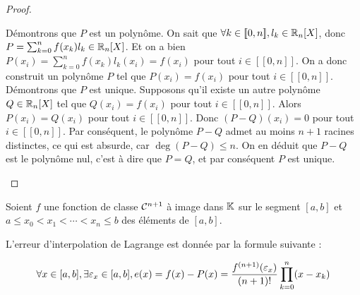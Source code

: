 \documentclass[12pt,a4paper]{report}
\begin{document}
\begin{proof}
    \begin{outline}
        \1 Démontrons que $P$ est un polynôme.
            \2 On sait que $\forall k \in [\![0,n]\!], l_k \in \mathbb{R}_n[X]$, donc $P = \sum_{k=0}^{n}f(x_k) l_k \in \mathbb{R}_n[X]$.
            \2 Et on a bien $P(x_i) = \sum_{k=0}^{n} f(x_k) l_k(x_i) = f(x_i)$ pour tout $i \in [\![0,n]\!]$.
            \2 On a donc construit un polynôme $P$ tel que $P(x_i) = f(x_i)$ pour tout $i \in [\![0,n]\!]$.
        \1 Démontrons que $P$ est unique.
            \2 Supposons qu'il existe un autre polynôme $Q \in \mathbb{R}_n[X]$ tel que $Q(x_i) = f(x_i)$ pour tout $i \in [\![0,n]\!]$.
            \2 Alors $P(x_i) = Q(x_i)$ pour tout $i \in [\![0,n]\!]$.
            \2 Donc $(P-Q)(x_i) = 0$ pour tout $i \in [\![0,n]\!]$.
            \2 Par conséquent, le polynôme $P-Q$ admet au moins $n+1$ racines distinctes, ce qui est absurde, car $\deg(P-Q) \le n$.
            \2 On en déduit que $P-Q$ est le polynôme nul, c'est à dire que $P=Q$, et par conséquent $P$ est unique.
    \end{outline}
\end{proof}

\begin{theorem}
    Soient $f$ une fonction de classe $\mathcal{C}^{n+1}$ à image dans $\mathbb{K}$ sur le segment $[a,b]$ et $a \le x_0 < x_1 < \cdots < x_n \le b$ des éléments de $[a,b]$.

    L'erreur d'interpolation de Lagrange est donnée par la formule suivante :

    $$\forall x \in [a,b], \exists \varepsilon_x \in [a,b], e(x) = f(x) - P(x) = \frac{f^{(n+1)}(\varepsilon_x)}{(n+1)!} \prod_{k=0}^{n} (x-x_k)$$
\end{theorem}
\end{document}
